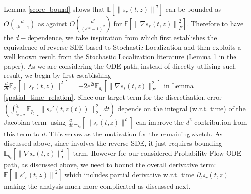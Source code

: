 \documentclass{article}
\begin{document}
{\noindent
 Lemma \ref{score_bound} shows that $\mathbb{E}\left[\left\|s_r(t,z)\right\|^2\right]$ can be bounded as $O(\frac{d}{e^{2t}-1})$ as against $O(\frac{d^2}{(e^{2t}-1)^2})$ for $\mathbb{E}\left[\left\|\nabla s_r(t,z)\right\|_F^2\right]$. {Therefore to have the $d-$dependence, we take inspiration from \cite{benton2023nearly} which first  establishes the equivalence of reverse SDE based to Stochastic Localization and then exploits a well known result from the Stochastic Localization literature (Lemma 1 in the paper). As we are considering the ODE path, instead of directly utilising such result, we begin by first establishing $\frac{d}{dt}\mathbb{E}_{q_t}[\|s_r(t,z)\|^2] = -2e^{2t}\mathbb{E}_{q_t}[\|\nabla s_r(t,z)\|^2_F]$ in Lemma \ref{spatial_time_relation}. Since our target term for the discretization error $\left(\int^{t_k}_{t_{k-2}}\mathbb{E}_{q_t}\left[\left\|s_r'(t,z(t)) \right\|_2^2\right]dt\right)$ depends on the integral (w.r.t. time) of the Jacobian term, using $\frac{d}{dt}\mathbb{E}_{q_t}[\|s_r(t,z)\|^2]$ can improve the $d^2$ contribution from this term to $d$. This serves as the motivation for the remaining sketch. As discussed above, since \cite{benton2023nearly} involves the reverse SDE, it just requires bounding $\mathbb{E}_{q_t}[\|\nabla s_r(t,z)\|^2_F]$ term. However for our considered Probability Flow ODE path, as discussed above, we need to bound the overall derivative term: $\mathbb{E}\left[\left\|s'_r(t,z)\right\|^2\right]$ which includes partial derivative w.r.t. time $\partial_t s_r(t,z)$ making the analysis much more complicated as discussed next.} \\ 


}
\end{document}
